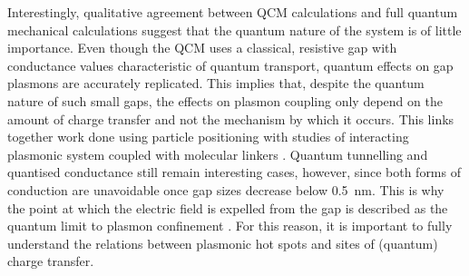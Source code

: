 \documentclass{article}
\begin{document}
Interestingly, qualitative agreement between QCM calculations and full quantum mechanical calculations suggest that the quantum nature of the system is of little importance. Even though the QCM uses a classical, resistive gap with conductance values characteristic of quantum transport, quantum effects on gap plasmons are accurately replicated. This implies that, despite the quantum nature of such small gaps, the effects on plasmon coupling only depend on the amount of charge transfer and not the mechanism by which it occurs. This links together work done using particle positioning \cite{savage2012, scholl2013} with studies of interacting plasmonic system coupled with molecular linkers \cite{tan2014, cha2014, benz2014}. Quantum tunnelling and quantised conductance still remain interesting cases, however, since both forms of conduction are unavoidable once gap sizes decrease below \SI{0.5}{nm}. This is why the point at which the electric field is expelled from the gap is described as the quantum limit to plasmon confinement \cite{savage2012}. For this reason, it is important to fully understand the relations between plasmonic hot spots and sites of (quantum) charge transfer.
\end{document}
